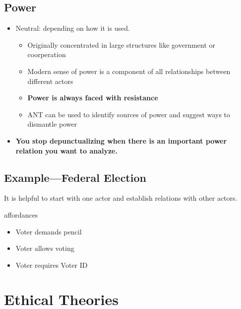\documentclass[a4paper]{article}
\numberwithin{equation}{section}
\begin{document}
\subsection{Power}
\begin{itemize}
    \item Neutral: depending on how it is used.
    \begin{itemize}
        \item Originally concentrated in large structures like government or coorperation
        \item Modern sense of power is a component of all relationships between different actors
        \item \textbf{Power is always faced with resistance}
        \item ANT can be used to identify sources of power and suggest ways to dismantle power   
    \end{itemize}
    \item \textbf{You stop depunctualizing when there is an important power relation you want to analyze.}
\end{itemize}

\subsection{Example---Federal Election}

It is helpful to start with one actor and establish relations with other actors. 

affordances
\begin{itemize}
    \item Voter demands pencil
    \item Voter allows voting
    \item Voter requires Voter ID
\end{itemize}

\section{Ethical Theories}
\end{document}
